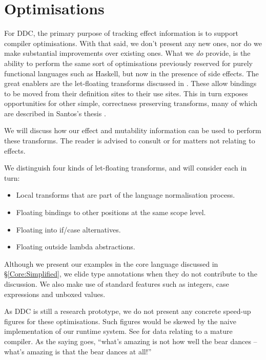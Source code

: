 \clearpage{}
\section{Optimisations}
\label{Core:Optimisations}

For DDC, the primary purpose of tracking effect information is to support compiler optimisations. With that said, we don't present any new ones, nor do we make substantial improvements over existing ones. What we \emph{do} provide, is the ability to perform the same sort of optimisations previously reserved for purely functional languages such as Haskell, but now in the presence of side effects. The great enablers are the let-floating transforms discussed in \cite{peyton-jones:let-floating}. These allow bindings to be moved from their definition sites to their use sites. This in turn exposes opportunities for other simple, correctness preserving transforms, many of which are described in Santos's thesis \cite{santos:compilation}.  

We will discuss how our effect and mutability information can be used to perform these transforms. The reader is advised to consult \cite{peyton-jones:let-floating} or \cite{santos:compilation} for matters not relating to effects.

We distinguish four kinds of let-floating transforms, and will consider each in turn:
\vspace{-1em}
\begin{itemize}
\item	Local transforms that are part of the language normalisation process.
\item	Floating bindings to other positions at the same scope level.
\item	Floating into if/case alternatives.
\item	Floating outside lambda abstractions.
\end{itemize}

Although we present our examples in the core language discussed in \S\ref{Core:Simplified}, we elide type annotations when they do not contribute to the discussion. We also make use of standard features such as integers, case expressions and unboxed values.

As DDC is still a research prototype, we do not present any concrete speed-up figures for these optimisations. Such figures would be skewed by the naive implementation of our runtime system. See \cite{santos:compilation} for data relating to a mature compiler. As the saying goes, ``what's amazing is not how well the bear dances -- what's amazing is that the bear dances at all!''


